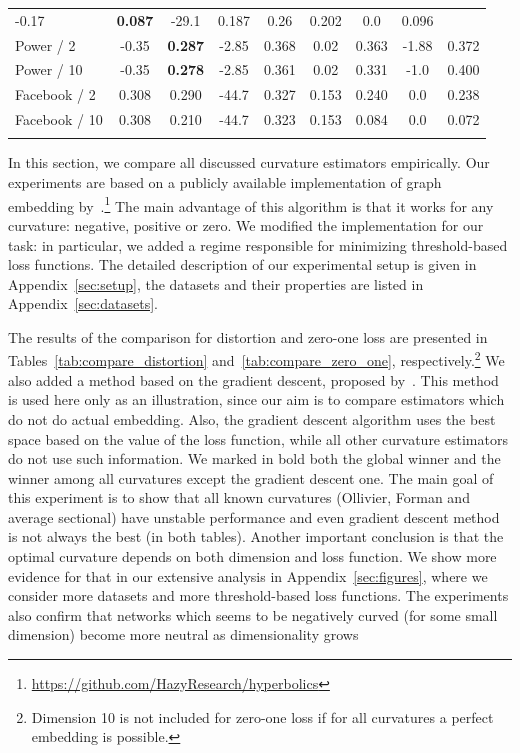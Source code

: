 \documentclass{article} %
\begin{document}
\begin{table}[t]
\begin{center}
\begin{tabular}{lcccccc|cc}
-0.17 & \textbf{0.087} & 
-29.1 & 0.187 & 
0.26 & 0.202 & 
0.0 & 0.096 \\
Power / 2 &
-0.35 & \textbf{0.287} &
-2.85 & 0.368 &
0.02 & 0.363 &
-1.88 & 0.372  \\
Power / 10 &
-0.35 & \textbf{0.278} &
 -2.85 &0.361 &
 0.02 & 0.331 &
-1.0 & 0.400  \\
Facebook / 2 &
0.308 & 0.290 & 
-44.7 & 0.327 & 
0.153 & 0.240 & 
0.0 & 0.238  \\
Facebook / 10 &
0.308 & 0.210 &
-44.7 & 0.323 & 
0.153 & 0.084 & 
0.0 & 0.072 \\
\hline \\
\end{tabular}
\end{center}
\end{table}

In this section, we compare all discussed curvature estimators empirically. Our experiments are based on a publicly available implementation of graph embedding by~\citet{gu2019learning}.\footnote{\url{https://github.com/HazyResearch/hyperbolics}} The main advantage of this algorithm is that it works for any curvature: negative, positive or zero. We modified the implementation for our task: in particular, we added a regime responsible for minimizing threshold-based loss functions. The detailed description of our experimental setup is given in Appendix~\ref{sec:setup}, the datasets and their properties are listed in Appendix~\ref{sec:datasets}.

The results of the comparison for distortion and zero-one loss are presented in Tables~\ref{tab:compare_distortion} and~\ref{tab:compare_zero_one}, 
respectively.\footnote{Dimension 10 is not included for zero-one loss if for all curvatures a perfect embedding is possible.} We also added a method based on the gradient descent, proposed by~\citet{gu2019learning}. This method is used here only as an illustration, since our aim is to compare estimators which do not do actual embedding.
Also, the gradient descent algorithm uses the best space based on the value of the loss function, while all other curvature estimators do not use such information.
We marked in bold both the global winner and the winner among all curvatures except the gradient descent one. The main goal of this experiment is to show that all known curvatures (Ollivier, Forman and average sectional) have unstable performance
and even gradient descent method is not always the best (in both tables). 
Another important conclusion is that the optimal curvature depends on both dimension and loss function. We show more evidence for that in our extensive analysis in Appendix~\ref{sec:figures}, where we consider more datasets and more threshold-based loss functions. The experiments also confirm that networks which seems to be negatively curved (for some small dimension) become more neutral as dimensionality grows
\end{document}
